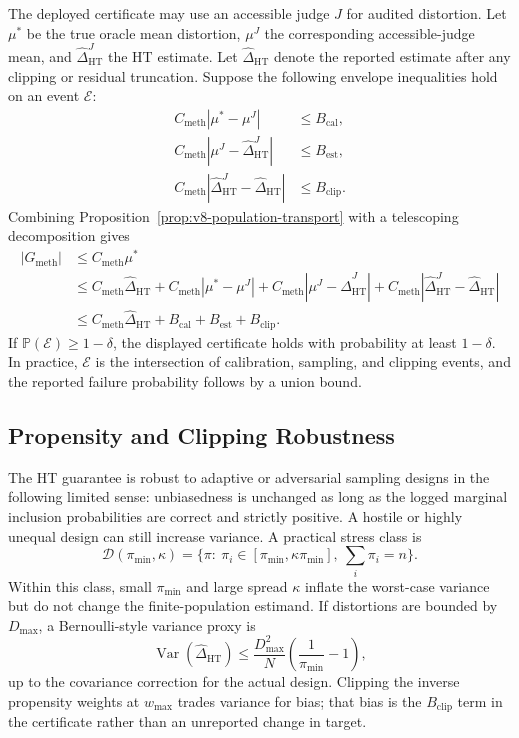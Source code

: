 The deployed certificate may use an accessible judge \(J\) for audited
distortion. Let \(\mu^\ast\) be the true oracle mean distortion,
\(\mu^J\) the corresponding accessible-judge mean, and
\(\widehat\Delta_{\mathrm{HT}}^J\) the HT estimate. Let
\(\widehat\Delta_{\mathrm{HT}}\) denote the reported estimate after any
clipping or residual truncation. Suppose the following envelope inequalities
hold on an event \(\mathcal E\):
\[
\begin{aligned}
C_{\mathrm{meth}}|\mu^\ast-\mu^J| &\le B_{\mathrm{cal}},\\
C_{\mathrm{meth}}|\mu^J-\widehat\Delta_{\mathrm{HT}}^J|
&\le B_{\mathrm{est}},\\
C_{\mathrm{meth}}|\widehat\Delta_{\mathrm{HT}}^J
-\widehat\Delta_{\mathrm{HT}}|
&\le B_{\mathrm{clip}} .
\end{aligned}
\]
Combining Proposition~\ref{prop:v8-population-transport} with a telescoping
decomposition gives
\[
\begin{aligned}
|G_{\mathrm{meth}}|
&\le C_{\mathrm{meth}}\mu^\ast\\
&\le
C_{\mathrm{meth}}\widehat\Delta_{\mathrm{HT}}
+
C_{\mathrm{meth}}|\mu^\ast-\mu^J|
+
C_{\mathrm{meth}}|\mu^J-\widehat\Delta_{\mathrm{HT}}^J|
+
C_{\mathrm{meth}}|\widehat\Delta_{\mathrm{HT}}^J
-\widehat\Delta_{\mathrm{HT}}|\\
&\le
C_{\mathrm{meth}}\widehat\Delta_{\mathrm{HT}}
+
B_{\mathrm{cal}}
+
B_{\mathrm{est}}
+
B_{\mathrm{clip}} .
\end{aligned}
\]
If \(\mathbb P(\mathcal E)\ge 1-\delta\), the displayed certificate holds
with probability at least \(1-\delta\). In practice, \(\mathcal E\) is the
intersection of calibration, sampling, and clipping events, and the reported
failure probability follows by a union bound.

\subsection{Propensity and Clipping Robustness}

The HT guarantee is robust to adaptive or adversarial sampling designs in the
following limited sense: unbiasedness is unchanged as long as the logged
marginal inclusion probabilities are correct and strictly positive. A hostile
or highly unequal design can still increase variance. A practical stress
class is
\[
  \mathcal D(\pi_{\min},\kappa)
  =
  \{\pi:\ \pi_i\in[\pi_{\min},\kappa\pi_{\min}],
  \ \sum_i\pi_i=n\}.
\]
Within this class, small \(\pi_{\min}\) and large spread \(\kappa\) inflate
the worst-case variance but do not change the finite-population estimand. If
distortions are bounded by \(D_{\max}\), a Bernoulli-style variance proxy is
\[
  \operatorname{Var}(\widehat\Delta_{\mathrm{HT}})
  \le
  \frac{D_{\max}^2}{N}
  \left(\frac{1}{\pi_{\min}}-1\right),
\]
up to the covariance correction for the actual design. Clipping the inverse
propensity weights at \(w_{\max}\) trades variance for bias; that bias is the
\(B_{\mathrm{clip}}\) term in the certificate rather than an unreported
change in target.


